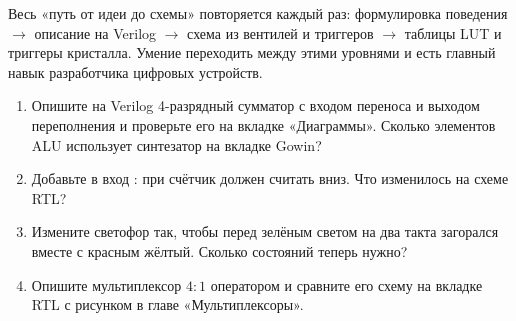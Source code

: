 \begin{ideabox}
Весь «путь от идеи до схемы» повторяется каждый раз:
формулировка поведения $\to$ описание на Verilog $\to$ схема из вентилей и
триггеров $\to$ таблицы LUT и триггеры кристалла. Умение переходить между
этими уровнями и есть главный навык разработчика цифровых устройств.
\end{ideabox}

\begin{taskbox}[Задания]
\begin{enumerate}
  \item Опишите на Verilog 4-разрядный сумматор с входом переноса и выходом
        переполнения и проверьте его на вкладке «Диаграммы». Сколько элементов
        ALU использует синтезатор на вкладке Gowin?
  \item Добавьте в  вход : при  счётчик должен
        считать вниз. Что изменилось на схеме RTL?
  \item Измените светофор так, чтобы перед зелёным светом на два такта
        загорался вместе с красным жёлтый. Сколько состояний теперь нужно?
  \item Опишите мультиплексор $4:1$ оператором  и
        сравните его схему на вкладке RTL с рисунком в главе «Мультиплексоры».
\end{enumerate}
\end{taskbox}

